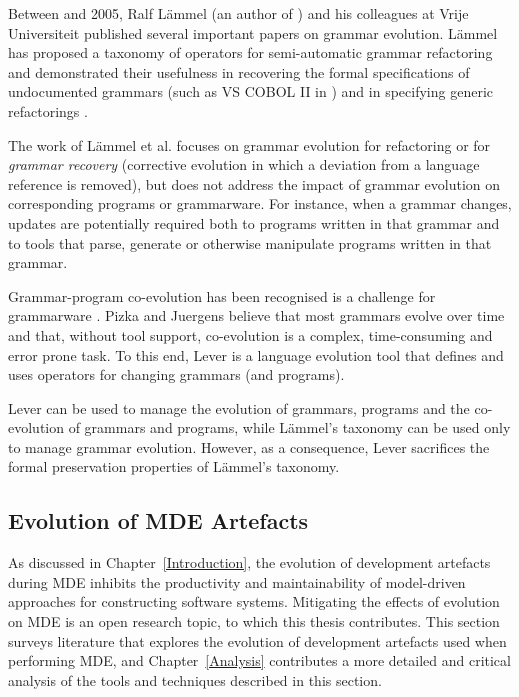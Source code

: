 Between  and 2005, Ralf L\"{a}mmel (an author of \cite{klint03grammarware}) and his colleagues at Vrije Universiteit published several important papers on grammar evolution. L\"{a}mmel has proposed a taxonomy of operators for semi-automatic grammar refactoring \cite{lammel01grammar_adaptation} and demonstrated their usefulness in recovering the formal specifications of undocumented grammars (such as VS COBOL II in \cite{lammel01semiautomatic}) and in specifying generic refactorings \cite{lammel02towards}. 

The work of L\"{a}mmel et al. focuses on grammar evolution for refactoring or for \emph{grammar recovery} (corrective evolution in which a deviation from a language reference is removed), but does not address the impact of grammar evolution on corresponding programs or grammarware. For instance, when a grammar changes, updates are potentially required both to programs written in that grammar and to tools that parse, generate or otherwise manipulate programs written in that grammar.

Gr\-am\-mar-program co-evolution has been recognised is a challenge for grammarware \cite{pizka07automating}. Pizka and Juergens believe that most grammars evolve over time and that, without tool support, co-evolution is a complex, time-consuming and error prone task. To this end, Lever \cite{pizka07automating} is a language evolution tool that defines and uses operators for changing grammars (and programs).

Lever \cc can be used to manage the evolution of grammars, programs and the co-evolution of grammars and programs, while L\"{a}mmel's taxonomy \cite{lammel01grammar_adaptation} can be used only to manage grammar evolution. However, as a consequence, Lever sacrifices the formal preservation properties of L\"{a}mmel's taxonomy.


\subsection{Evolution of MDE Artefacts}
\label{subsec:mde_evo}
As discussed in Chapter~\ref{Introduction}, the evolution of development artefacts during MDE inhibits the productivity and maintainability of model-driven approaches for constructing software systems. Mitigating the effects of evolution on MDE is an open research topic, to which this thesis contributes. This section surveys literature that explores the evolution of development artefacts used when performing MDE, and Chapter~\ref{Analysis} contributes a more detailed and critical analysis of the tools and techniques described in this section.

